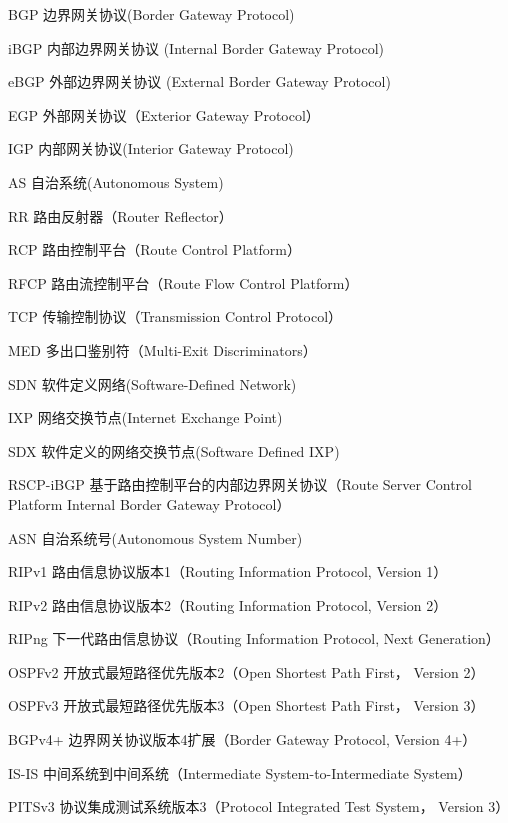 \begin{denotation}[3cm]
\item[BGP] 边界网关协议(Border Gateway Protocol)
\item[iBGP] 内部边界网关协议 (Internal Border Gateway Protocol)
\item[eBGP] 外部边界网关协议 (External Border Gateway Protocol)
\item[EGP] 外部网关协议（Exterior Gateway Protocol）
\item[IGP] 内部网关协议(Interior Gateway Protocol)
\item[AS] 自治系统(Autonomous System)
\item[RR] 路由反射器（Router Reflector）
\item[RCP] 路由控制平台（Route Control Platform）
\item[RFCP] 路由流控制平台（Route Flow Control Platform）
\item[TCP] 传输控制协议（Transmission Control Protocol）
\item[MED] 多出口鉴别符（Multi-Exit Discriminators）
\item[SDN] 软件定义网络(Software-Defined Network)
\item[IXP] 网络交换节点(Internet Exchange Point)
\item[SDX] 软件定义的网络交换节点(Software Defined IXP)
\item[RSCP-iBGP] 基于路由控制平台的内部边界网关协议（Route Server Control Platform Internal Border Gateway Protocol）
\item[ASN] 自治系统号(Autonomous System Number)
\item[RIPv1] 路由信息协议版本1（Routing Information Protocol, Version 1）
\item[RIPv2] 路由信息协议版本2（Routing Information Protocol, Version 2）
\item[RIPng] 下一代路由信息协议（Routing Information Protocol, Next Generation）
\item[OSPFv2] 开放式最短路径优先版本2（Open Shortest Path First， Version 2）
\item[OSPFv3] 开放式最短路径优先版本3（Open Shortest Path First， Version 3）
\item[BGPv4+] 边界网关协议版本4扩展（Border Gateway Protocol, Version 4+）
\item[IS-IS] 中间系统到中间系统（Intermediate System-to-Intermediate System）
\item[PITSv3] 协议集成测试系统版本3（Protocol Integrated Test System， Version 3）
\end{denotation}

